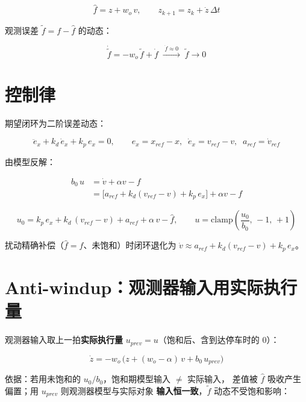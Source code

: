 \documentclass[11pt,a4paper]{article}
\begin{document}
\begin{equation}
\hat f = z + w_o\,v,
\qquad
z_{k+1} = z_k + \dot z\,\Delta t
\end{equation}

观测误差 $\tilde f = f - \hat f$ 的动态：

\begin{equation}
\dot{\tilde f} = -w_o\,\tilde f + \dot f \;\xrightarrow{\;\dot f\approx 0\;}\; \tilde f \to 0
\end{equation}

\section{控制律}

期望闭环为二阶误差动态：

\begin{equation}
\ddot e_x + k_d\,\dot e_x + k_p\,e_x = 0,
\qquad
e_x = x_{ref} - x,\;\; \dot e_x = v_{ref} - v,\;\; a_{ref} = \dot v_{ref}
\end{equation}

由模型反解：

\begin{align}
b_0\,u &= \dot v + \alpha v - f \\
       &= \big[a_{ref} + k_d(v_{ref}-v) + k_p\,e_x\big] + \alpha v - f
\end{align}

\begin{equation}
\boxed{u_0 = k_p\,e_x + k_d\,(v_{ref}-v) + a_{ref} + \alpha\,v - \hat f},
\qquad
u = \mathrm{clamp}\!\left(\frac{u_0}{b_0},\,-1,\,+1\right)
\end{equation}

扰动精确补偿（$\hat f = f$、未饱和）时闭环退化为
$\dot v \approx a_{ref} + k_d(v_{ref}-v) + k_p\,e_x$。

\section{Anti-windup：观测器输入用实际执行量}

观测器输入取上一拍\textbf{实际执行量} $u_{prev} = u$（饱和后、含到达停车时的 $0$）：

\begin{equation}
\dot z = -w_o\,\big(z + (w_o-\alpha)\,v + b_0\,u_{prev}\big)
\end{equation}

依据：若用未饱和的 $u_0/b_0$，饱和期模型输入 $\neq$ 实际输入，
差值被 $\hat f$ 吸收产生偏置；用 $u_{prev}$ 则观测器模型与实际对象
\textbf{输入恒一致}，$\tilde f$ 动态不受饱和影响：
\end{document}
